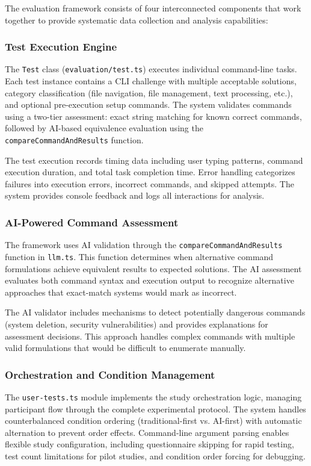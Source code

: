 The evaluation framework consists of four interconnected components that work together to provide systematic data collection and analysis capabilities:

\subsubsection{Test Execution Engine}

The \texttt{Test} class (\texttt{evaluation/test.ts}) executes individual command-line tasks. Each test instance contains a CLI challenge with multiple acceptable solutions, category classification (file navigation, file management, text processing, etc.), and optional pre-execution setup commands. The system validates commands using a two-tier assessment: exact string matching for known correct commands, followed by AI-based equivalence evaluation using the \texttt{compareCommandAndResults} function.

The test execution records timing data including user typing patterns, command execution duration, and total task completion time. Error handling categorizes failures into execution errors, incorrect commands, and skipped attempts. The system provides console feedback and logs all interactions for analysis.

\subsubsection{AI-Powered Command Assessment}

The framework uses AI validation through the \texttt{compareCommandAndResults} function in \texttt{llm.ts}. This function determines when alternative command formulations achieve equivalent results to expected solutions. The AI assessment evaluates both command syntax and execution output to recognize alternative approaches that exact-match systems would mark as incorrect.

The AI validator includes mechanisms to detect potentially dangerous commands (system deletion, security vulnerabilities) and provides explanations for assessment decisions. This approach handles complex commands with multiple valid formulations that would be difficult to enumerate manually.

\subsubsection{Orchestration and Condition Management}

The \texttt{user-tests.ts} module implements the study orchestration logic, managing participant flow through the complete experimental protocol. The system handles counterbalanced condition ordering (traditional-first vs. AI-first) with automatic alternation to prevent order effects. Command-line argument parsing enables flexible study configuration, including questionnaire skipping for rapid testing, test count limitations for pilot studies, and condition order forcing for debugging.

